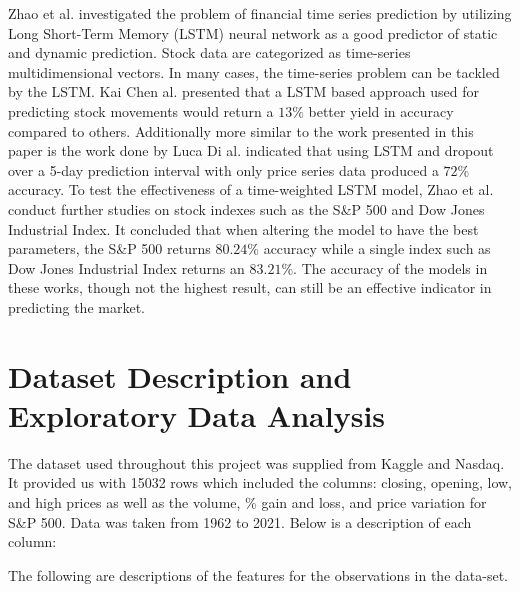 \documentclass{article}
\begin{document}
Zhao et al. investigated the problem of financial time series prediction by utilizing Long Short-Term Memory (LSTM) neural network as a good predictor of static and dynamic prediction. Stock data are categorized as time-series multidimensional vectors. In many cases, the time-series problem can be tackled by the LSTM. Kai Chen al. presented that a LSTM based approach used for predicting stock movements would return a $13\%$ better yield in accuracy compared to others.\cite{LSTM} Additionally more similar to the work presented in this paper is the work done by Luca Di al. indicated that using LSTM and dropout over a 5-day prediction interval with only price series data produced a $72\%$ accuracy.\cite{Time-Weighted LSTM} To test the effectiveness of a time-weighted LSTM model, Zhao et al. conduct further studies on stock indexes such as the S\&P 500 and Dow Jones Industrial Index. It concluded that when altering the model to have the best parameters, the S\&P 500 returns $80.24\%$ accuracy while a single index such as Dow Jones Industrial Index returns an $83.21\%$.\cite{RNN} The accuracy of the models in these works, though not the highest result, can still be an effective indicator in predicting the market.

\section{Dataset Description and Exploratory Data Analysis} 
The dataset used throughout this project was supplied from Kaggle and Nasdaq. It provided us with 15032 rows which included the columns: closing, opening, low, and high prices as well as the volume, \% gain and loss, and price variation for S\&P 500. Data was taken from 1962 to 2021.\cite{SNP_Daily} 
Below is a description of each column:

The following are descriptions of the features for the observations in the data-set.
\end{document}
